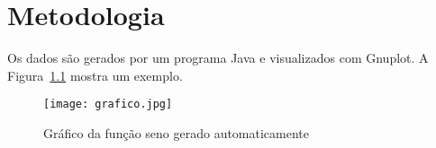 \chapter{Metodologia}
Os dados são gerados por um programa Java e visualizados com Gnuplot. A Figura~\ref{fig:grafico} mostra um exemplo.

\begin{figure}[H]
\centering
\texttt{[image: grafico.jpg]}
\caption{Gráfico da função seno gerado automaticamente}
\label{fig:grafico}
\end{figure}

